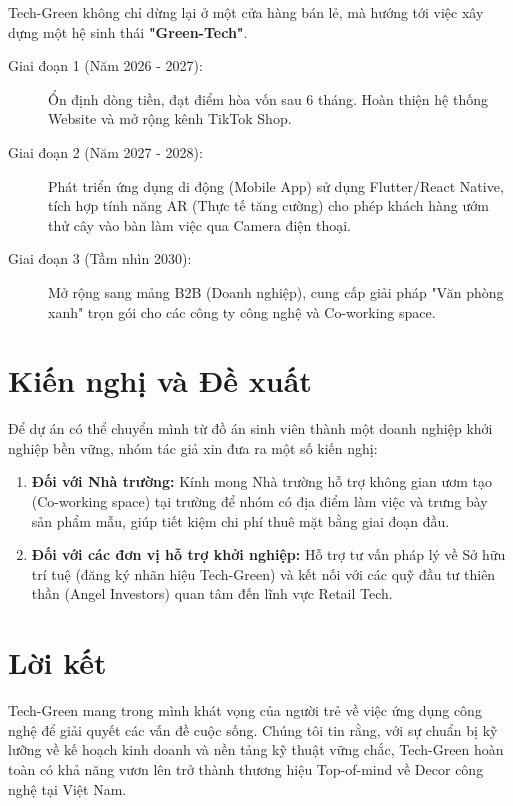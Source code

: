 Tech-Green không chỉ dừng lại ở một cửa hàng bán lẻ, mà hướng tới việc xây dựng một hệ sinh thái \textbf{"Green-Tech"}.

\begin{description}
    \item[Giai đoạn 1 (Năm 2026 - 2027):] Ổn định dòng tiền, đạt điểm hòa vốn sau 6 tháng. Hoàn thiện hệ thống Website và mở rộng kênh TikTok Shop.
    \item[Giai đoạn 2 (Năm 2027 - 2028):] Phát triển ứng dụng di động (Mobile App) sử dụng Flutter/React Native, tích hợp tính năng AR (Thực tế tăng cường) cho phép khách hàng ướm thử cây vào bàn làm việc qua Camera điện thoại.
    \item[Giai đoạn 3 (Tầm nhìn 2030):] Mở rộng sang mảng B2B (Doanh nghiệp), cung cấp giải pháp "Văn phòng xanh" trọn gói cho các công ty công nghệ và Co-working space.
\end{description}

\section{Kiến nghị và Đề xuất}

Để dự án có thể chuyển mình từ đồ án sinh viên thành một doanh nghiệp khởi nghiệp bền vững, nhóm tác giả xin đưa ra một số kiến nghị:

\begin{enumerate}
    \item \textbf{Đối với Nhà trường:} Kính mong Nhà trường hỗ trợ không gian ươm tạo (Co-working space) tại trường để nhóm có địa điểm làm việc và trưng bày sản phẩm mẫu, giúp tiết kiệm chi phí thuê mặt bằng giai đoạn đầu.
    \item \textbf{Đối với các đơn vị hỗ trợ khởi nghiệp:} Hỗ trợ tư vấn pháp lý về Sở hữu trí tuệ (đăng ký nhãn hiệu Tech-Green) và kết nối với các quỹ đầu tư thiên thần (Angel Investors) quan tâm đến lĩnh vực Retail Tech.
\end{enumerate}

\section*{Lời kết}
Tech-Green mang trong mình khát vọng của người trẻ về việc ứng dụng công nghệ để giải quyết các vấn đề cuộc sống. Chúng tôi tin rằng, với sự chuẩn bị kỹ lưỡng về kế hoạch kinh doanh và nền tảng kỹ thuật vững chắc, Tech-Green hoàn toàn có khả năng vươn lên trở thành thương hiệu Top-of-mind về Decor công nghệ tại Việt Nam.